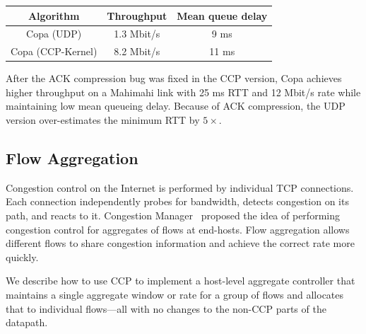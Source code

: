 \begin{tabular}{c|c|c}
    Algorithm & Throughput & Mean queue delay \\
    \hline
    Copa (UDP) & 1.3 Mbit/s & 9 ms\\
    Copa (CCP-Kernel) & 8.2 Mbit/s  & 11 ms\\
\end{tabular}

\smallskip
After the ACK compression bug was fixed in the CCP version, Copa achieves higher throughput on a Mahimahi link with 25 ms RTT and 12 Mbit/s rate while maintaining low mean queueing delay. Because of ACK compression, the UDP version over-estimates the minimum RTT by $5\times$.


\subsection{Flow Aggregation}
\label{s:capabilities:agg}
%
Congestion control on the Internet is performed by individual TCP connections. Each connection independently probes for bandwidth, detects congestion on its path, and reacts to it. Congestion Manager~\cite{cm} proposed the idea of performing congestion control for aggregates of flows at end-hosts. Flow aggregation allows different flows to share congestion information and achieve the correct rate more quickly. 

We describe how to use CCP to implement a host-level aggregate controller that maintains a single aggregate window or rate for a group of flows and allocates that to individual flows---all with no changes to the non-CCP parts of the datapath.





